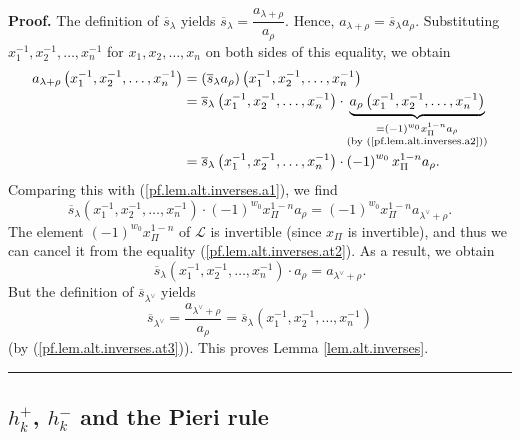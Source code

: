 \documentclass[numbers=enddot,12pt,final,onecolumn,notitlepage]{scrartcl}%
\theoremstyle{definition}
\newenvironment{proof}[1][Proof]{\noindent\textbf{#1.} }{\ \rule{0.5em}{0.5em}}
\begin{document}
\begin{proof}
The definition of $\overline{s}_{\lambda}$ yields $\overline{s}_{\lambda
}=\dfrac{a_{\lambda+\rho}}{a_{\rho}}$. Hence, $a_{\lambda+\rho}=\overline
{s}_{\lambda}a_{\rho}$. Substituting $x_{1}^{-1},x_{2}^{-1},\ldots,x_{n}^{-1}$
for $x_{1},x_{2},\ldots,x_{n}$ on both sides of this equality, we obtain%
\begin{align*}
a_{\lambda+\rho}\left(  x_{1}^{-1},x_{2}^{-1},\ldots,x_{n}^{-1}\right)   &
=\left(  \overline{s}_{\lambda}a_{\rho}\right)  \left(  x_{1}^{-1},x_{2}%
^{-1},\ldots,x_{n}^{-1}\right) \\
&  =\overline{s}_{\lambda}\left(  x_{1}^{-1},x_{2}^{-1},\ldots,x_{n}%
^{-1}\right)  \cdot\underbrace{a_{\rho}\left(  x_{1}^{-1},x_{2}^{-1}%
,\ldots,x_{n}^{-1}\right)  }_{\substack{=\left(  -1\right)  ^{w_{0}}x_{\Pi
}^{1-n}a_{\rho}\\\text{(by (\ref{pf.lem.alt.inverses.a2}))}}}\\
&  =\overline{s}_{\lambda}\left(  x_{1}^{-1},x_{2}^{-1},\ldots,x_{n}%
^{-1}\right)  \cdot\left(  -1\right)  ^{w_{0}}x_{\Pi}^{1-n}a_{\rho}.
\end{align*}
Comparing this with (\ref{pf.lem.alt.inverses.a1}), we find%
\begin{equation}
\overline{s}_{\lambda}\left(  x_{1}^{-1},x_{2}^{-1},\ldots,x_{n}^{-1}\right)
\cdot\left(  -1\right)  ^{w_{0}}x_{\Pi}^{1-n}a_{\rho}=\left(  -1\right)
^{w_{0}}x_{\Pi}^{1-n}a_{\lambda^{\vee}+\rho}. \label{pf.lem.alt.inverses.at2}%
\end{equation}
The element $\left(  -1\right)  ^{w_{0}}x_{\Pi}^{1-n}$ of $\mathcal{L}$ is
invertible (since $x_{\Pi}$ is invertible), and thus we can cancel it from the
equality (\ref{pf.lem.alt.inverses.at2}). As a result, we obtain%
\begin{equation}
\overline{s}_{\lambda}\left(  x_{1}^{-1},x_{2}^{-1},\ldots,x_{n}^{-1}\right)
\cdot a_{\rho}=a_{\lambda^{\vee}+\rho}. \label{pf.lem.alt.inverses.at3}%
\end{equation}
But the definition of $\overline{s}_{\lambda^{\vee}}$ yields%
\[
\overline{s}_{\lambda^{\vee}}=\dfrac{a_{\lambda^{\vee}+\rho}}{a_{\rho}%
}=\overline{s}_{\lambda}\left(  x_{1}^{-1},x_{2}^{-1},\ldots,x_{n}%
^{-1}\right)
\]
(by (\ref{pf.lem.alt.inverses.at3})). This proves Lemma \ref{lem.alt.inverses}.
\end{proof}

\subsection{$h_{k}^{+}$, $h_{k}^{-}$ and the Pieri rule}
\end{document}
